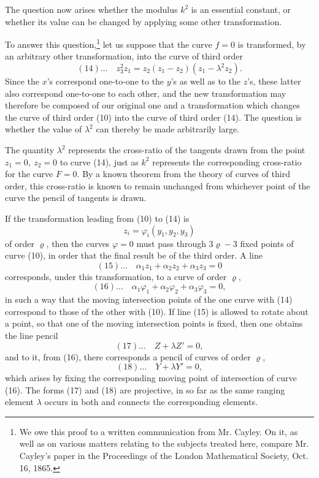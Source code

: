 \documentclass[10pt]{article}
\begin{document}
The question now arises whether the modulus \(k^2\) is an essential constant, or whether its value can be changed by applying some other transformation.

To answer this question,\footnote{We owe this proof to a written communication from Mr. Cayley. On it, as well as on various matters relating to the subjects treated here, compare Mr. Cayley's paper in the Proceedings of the London Mathematical Society, Oct. 16, 1865.} let us suppose that the curve \(f=0\) is transformed, by an arbitrary other transformation, into the curve of third order
\[
(14)\ldots\quad z_3^2z_1=z_2(z_1-z_2)(z_1-\lambda^2z_2).
\]
Since the \(x\)'s correspond one-to-one to the \(y\)'s as well as to the \(z\)'s, these latter also correspond one-to-one to each other, and the new transformation may therefore be composed of our original one and a transformation which changes the curve of third order (10) into the curve of third order (14). The question is whether the value of \(\lambda^2\) can thereby be made arbitrarily large.

The quantity \(\lambda^2\) represents the cross-ratio of the tangents drawn from the point \(z_1=0,\ z_2=0\) to curve (14), just as \(k^2\) represents the corresponding cross-ratio for the curve \(F=0\). By a known theorem from the theory of curves of third order, this cross-ratio is known to remain unchanged from whichever point of the curve the pencil of tangents is drawn.

If the transformation leading from (10) to (14) is
\[
z_i=\varphi_i(y_1,y_2,y_3)
\]
of order \(\varrho\), then the curves \(\varphi=0\) must pass through \(3\varrho-3\) fixed points of curve (10), in order that the final result be of the third order. A line
\[
(15)\ldots\quad \alpha_1z_1+\alpha_2z_2+\alpha_3z_3=0
\]
corresponds, under this transformation, to a curve of order \(\varrho\),
\[
(16)\ldots\quad \alpha_1\varphi_1+\alpha_2\varphi_2+\alpha_3\varphi_3=0,
\]
in such a way that the moving intersection points of the one curve with (14) correspond to those of the other with (10). If line (15) is allowed to rotate about a point, so that one of the moving intersection points is fixed, then one obtains the line pencil
\[
(17)\ldots\quad Z+\lambda Z'=0,
\]
and to it, from (16), there corresponds a pencil of curves of order \(\varrho\),
\[
(18)\ldots\quad Y+\lambda Y'=0,
\]
which arises by fixing the corresponding moving point of intersection of curve (16). The forms (17) and (18) are projective, in so far as the same ranging element \(\lambda\) occurs in both and connects the corresponding elements.
\end{document}
